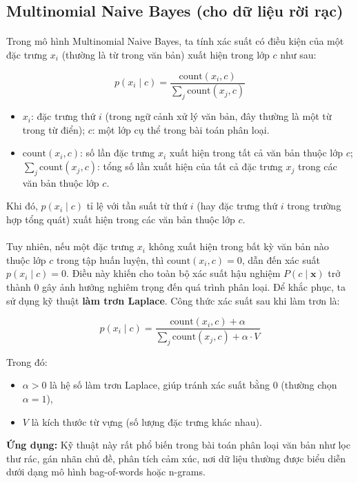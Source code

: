 \subsection{Multinomial Naive Bayes (cho dữ liệu rời rạc)}
\paragraph{}{Trong mô hình Multinomial Naive Bayes, ta tính xác suất có điều kiện của một đặc trưng \( x_i \) (thường là từ trong văn bản) xuất hiện trong lớp \( c \) như sau:}

\[
p(x_i \mid c) = \frac{\text{count}(x_i, c)}{\sum_j \text{count}(x_j, c)}
\]
\begin{itemize}
  \item \( x_i \): đặc trưng thứ \( i \) (trong ngữ cảnh xử lý văn bản, đây thường là một từ trong từ điển); \( c \): một lớp cụ thể trong bài toán phân loại.
  \item \( \text{count}(x_i, c) \): số lần đặc trưng \( x_i \) xuất hiện trong tất cả văn bản thuộc lớp \( c \); \( \sum_j \text{count}(x_j, c) \): tổng số lần xuất hiện của tất cả đặc trưng \( x_j \) trong các văn bản thuộc lớp \( c \).
\end{itemize}

Khi đó, \( p(x_i \mid c) \) tỉ lệ với tần suất từ thứ \( i \) (hay đặc trưng thứ \( i \) trong trường hợp tổng quát) xuất hiện trong các văn bản thuộc lớp \( c \).

\paragraph{} {Tuy nhiên, nếu một đặc trưng \( x_i \) không xuất hiện trong bất kỳ văn bản nào thuộc lớp \( c \) trong tập huấn luyện, thì \( \text{count}(x_i, c) = 0 \), dẫn đến xác suất \( p(x_i \mid c) = 0 \). Điều này khiến cho toàn bộ xác suất hậu nghiệm \( P(c \mid \mathbf{x}) \) trở thành 0 gây ảnh hưởng nghiêm trọng đến quá trình phân loại. Để khắc phục, ta sử dụng kỹ thuật \textbf{làm trơn Laplace}. Công thức xác suất sau khi làm trơn là:}

\[
p(x_i \mid c) = \frac{\text{count}(x_i, c) + \alpha}{\sum_j \text{count}(x_j, c) + \alpha \cdot V}
\]

Trong đó:
\begin{itemize}
    \item \( \alpha > 0 \) là hệ số làm trơn Laplace, giúp tránh xác suất bằng 0 (thường chọn \( \alpha = 1 \)),
    \item \( V \) là kích thước từ vựng (số lượng đặc trưng khác nhau).
\end{itemize}

\textbf{Ứng dụng:} Kỹ thuật này rất phổ biến trong bài toán phân loại văn bản như lọc thư rác, gán nhãn chủ đề, phân tích cảm xúc, nơi dữ liệu thường được biểu diễn dưới dạng mô hình bag-of-words hoặc n-grams.